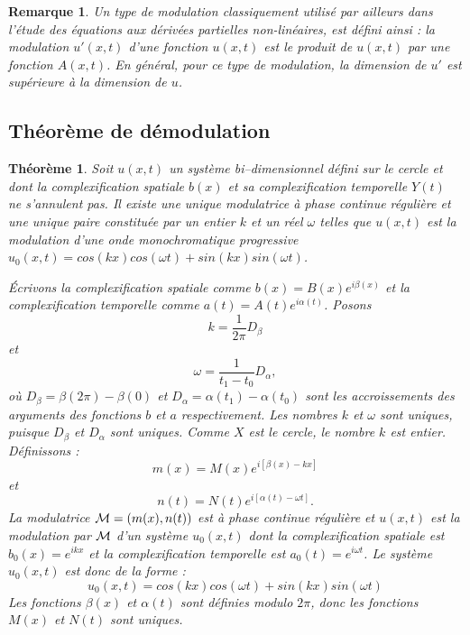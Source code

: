 \documentclass{book}
\newtheorem{thm}{Th\'eor\`eme}[chapter]
\newtheorem{rem}{Remarque}[chapter]
\newenvironment{pf}{{\bf Preuve.} \it}{\rm}
\begin{document}
\begin{rem}\label{remmodulationeq}
Un type de modulation classiquement utilis\'e par
ailleurs \cite{Bers75,Craik85,Manneville91}
dans l'\'etude des \'equations aux d\'eriv\'ees partielles
non-lin\'eaires, est d\'efini ainsi :
la modulation $u'(x,t)$ d'une fonction $u(x,t)$ est le produit
de  $u(x,t)$ par une fonction $A(x,t)$.
En g\'en\'eral, pour ce type de modulation, la dimension de
$u'$ est sup\'erieure \`a la dimension de $u$.
\end{rem}


\subsection{Th\'eor\`eme de d\'emodulation}


\begin{thm}\label{theokey}
Soit $u(x,t)$ un syst\`eme bi--dimensionnel d\'efini sur le cercle
et dont la  complexification spatiale $b(x)$ et sa complexification
temporelle 
$Y(t)$ ne s'annulent pas.
Il existe une unique modulatrice \`a phase continue r\'eguli\`ere et
une unique paire constitu\'ee par 
un entier $k$ et un r\'eel $\omega$ telles que $u(x,t)$ est la
modulation d'une onde monochromatique progressive  
$u_0(x,t)=cos(kx)cos(\omega t)+sin(kx)sin(\omega t)$.\label{theomod}
\end{thm}

\begin{pf}
\'Ecrivons la complexification spatiale comme $b(x)=B(x)e^{i\beta(x)}$
et la complexification temporelle comme $a(t)=A(t)e^{i\alpha(t)}$.
Posons 
\begin{equation}
k=\frac{1}{2\pi}D_\beta
\end{equation}
et
\begin{equation}
\omega=\frac{1}{t_1-t_0}D_\alpha,
\end{equation}
o\`u $D_\beta=\beta(2\pi)-\beta(0)$ et
$D_\alpha=\alpha(t_1)-\alpha(t_0)$ sont les accroissements des
arguments des fonctions $b$ et $a$ respectivement. Les nombres $k$ et
$\omega$ sont uniques, puisque $D_\beta$ et $D_\alpha$ sont uniques.
Comme $X$ est le cercle, le nombre $k$ est entier.
D\'efinissons :
\begin{equation}
m(x)=M(x)e^{i[\beta(x)-kx]}
\end{equation}
et
\begin{equation}
n(t)=N(t)e^{i[\alpha(t)-\omega t]}.
\end{equation}
La modulatrice ${\cal M}=(m(x),n(t))$ est \`a phase continue r\'eguli\`ere
et $u(x,t)$ est la modulation par ${\cal
M}$ d'un syst\`eme  $u_0(x,t)$ dont la complexification spatiale est
$b_0(x)=e^{ikx}$ et la complexification temporelle est
$a_0(t)=e^{i\omega t}$. Le syst\`eme $u_0(x,t)$ est donc de la forme :
\begin{equation}
u_0(x,t)=cos(kx)cos(\omega t)+sin(kx)sin(\omega t)
\end{equation}
Les fonctions $\beta(x)$ et $\alpha(t)$ sont d\'efinies modulo $2\pi$,
donc les fonctions $M(x)$ et $N(t)$ sont uniques.
\end{pf}
\end{document}
